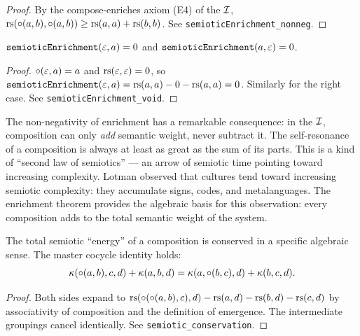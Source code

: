 \begin{proof}
By the compose-enriches axiom (E4) of the $\mathcal{I}$,
$\mathrm{rs}(\circ(a,b), \circ(a,b)) \geq \mathrm{rs}(a,a) + \mathrm{rs}(b,b)$. See
\texttt{semioticEnrichment\_nonneg}.
\end{proof}

\begin{theorem}
\label{thm:enrichment-void}
$\texttt{semioticEnrichment}(\varepsilon, a) = 0$ and
$\texttt{semioticEnrichment}(a, \varepsilon) = 0$.
\end{theorem}

\begin{proof}
$\circ(\varepsilon, a) = a$ and $\mathrm{rs}(\varepsilon, \varepsilon) = 0$, so
$\texttt{semioticEnrichment}(\varepsilon, a) = \mathrm{rs}(a, a) - 0 - \mathrm{rs}(a, a)
= 0$. Similarly for the right case. See
\texttt{semioticEnrichment\_void}.
\end{proof}

\begin{interpretation}
The non-negativity of enrichment has a remarkable consequence: in the
$\mathcal{I}$, composition can only \emph{add} semantic weight, never subtract
it. The self-resonance of a composition is always at least as great as
the sum of its parts. This is a kind of ``second law of semiotics'' ---
an arrow of semiotic time pointing toward increasing complexity. Lotman
observed that cultures tend toward increasing semiotic complexity: they
accumulate signs, codes, and metalanguages. The enrichment theorem
provides the algebraic basis for this observation: every composition
adds to the total semantic weight of the system.
\end{interpretation}

\begin{theorem}
\label{thm:conservation}
The total semiotic ``energy'' of a composition is conserved in a
specific algebraic sense. The master cocycle identity holds:
\[
  \kappa(\circ(a,b), c, d) + \kappa(a, b, d)
  = \kappa(a, \circ(b,c), d) + \kappa(b, c, d).
\]
\end{theorem}

\begin{proof}
Both sides expand to
$\mathrm{rs}(\circ(\circ(a,b),c), d) - \mathrm{rs}(a, d) - \mathrm{rs}(b, d) - \mathrm{rs}(c, d)$
by associativity of composition and the definition of emergence. The
intermediate groupings cancel identically. See
\texttt{semiotic\_conservation}.
\end{proof}

